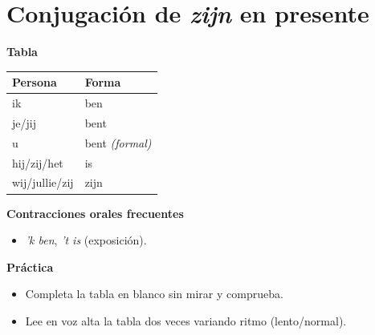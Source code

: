 \section{Conjugación de \textit{zijn} en presente}
\textbf{Tabla}
\begin{center}
\begin{tabular}{ll}
\toprule
Persona & Forma \\
\midrule
ik & ben \\
je/jij & bent \\
u & bent \textit{(formal)} \\
hij/zij/het & is \\
wij/jullie/zij & zijn \\
\bottomrule
\end{tabular}
\end{center}

\textbf{Contracciones orales frecuentes}
\begin{itemize}[leftmargin=*]
  \item \textit{'k ben}, \textit{'t is} (exposición).
\end{itemize}

\textbf{Práctica}
\begin{itemize}[leftmargin=*]
  \item Completa la tabla en blanco sin mirar y comprueba.
  \item Lee en voz alta la tabla dos veces variando ritmo (lento/normal).
\end{itemize}

